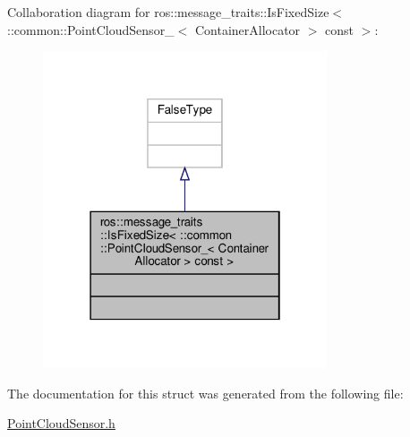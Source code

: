 Collaboration diagram for ros\+:\+:message\+\_\+traits\+:\+:Is\+Fixed\+Size$<$ \+:\+:common\+:\+:Point\+Cloud\+Sensor\+\_\+$<$ Container\+Allocator $>$ const $>$\+:\nopagebreak
\begin{figure}[H]
\begin{center}
\leavevmode
\includegraphics[width=238pt]{da/db3/structros_1_1message__traits_1_1IsFixedSize_3_01_1_1common_1_1PointCloudSensor___3_01ContainerAle322e886202d304767bad22168c4ef06}
\end{center}
\end{figure}


The documentation for this struct was generated from the following file\+:\begin{DoxyCompactItemize}
\item 
\hyperlink{PointCloudSensor_8h}{Point\+Cloud\+Sensor.\+h}\end{DoxyCompactItemize}
